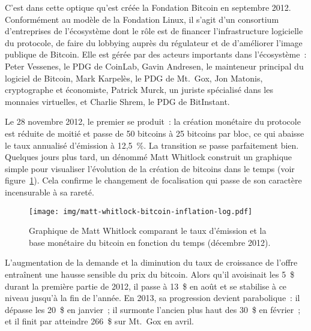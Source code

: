 C'est dans cette optique qu'est créée la Fondation Bitcoin en septembre 2012. Conformément au modèle de la Fondation Linux, il s'agit d'un consortium d'entreprises de l'écosystème dont le rôle est de financer l'infrastructure logicielle du protocole, de faire du lobbying auprès du régulateur et de d'améliorer l'image publique de Bitcoin. Elle est gérée par des acteurs importants dans l'écosystème~: Peter Vessenes, le PDG de CoinLab, Gavin Andresen, le mainteneur principal du logiciel de Bitcoin, Mark Karpelès, le PDG de Mt.~Gox, Jon Matonis, cryptographe et économiste, Patrick Murck, un juriste spécialisé dans les monnaies virtuelles, et Charlie Shrem, le PDG de BitInstant.

Le 28 novembre 2012, le premier  se produit~: la création monétaire du protocole est réduite de moitié et passe de 50 bitcoins à 25 bitcoins par bloc, ce qui abaisse le taux annualisé d'émission à 12,5~\%. La transition se passe parfaitement bien. Quelques jours plus tard, un dénommé Matt Whitlock construit un graphique simple pour visualiser l'évolution de la création de bitcoins dans le temps (voir figure~\ref{fig:bitcoin-inflation}). Cela confirme le changement de focalisation qui passe de son caractère incensurable à sa rareté.

\begin{figure}[h]
  \centering
  \texttt{[image: img/matt-whitlock-bitcoin-inflation-log.pdf]}
  \caption{Graphique de Matt Whitlock comparant le taux d'émission et la base monétaire du bitcoin en fonction du temps (décembre 2012).}
  \label{fig:bitcoin-inflation}
\end{figure}

L'augmentation de la demande et la diminution du taux de croissance de l'offre entraînent une hausse sensible du prix du bitcoin. Alors qu'il avoisinait les 5~\$ durant la première partie de 2012, il passe à 13~\$ en août et se stabilise à ce niveau jusqu'à la fin de l'année. En 2013, sa progression devient parabolique~: il dépasse les 20~\$ en janvier~; il surmonte l'ancien plus haut des 30~\$ en février~; et il finit par atteindre 266~\$ sur Mt.~Gox en avril.

